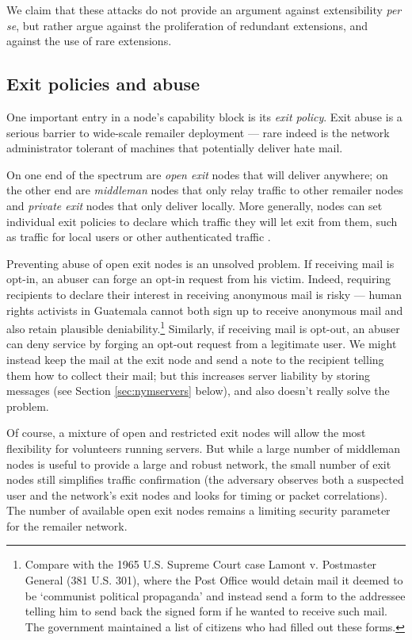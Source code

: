 \documentclass[11pt]{IEEEtran}
\begin{document}
We claim that these attacks do not provide an argument against
extensibility \emph{per se}, but rather argue against the proliferation
of redundant extensions, and against the use of rare extensions.  

\subsection{Exit policies and abuse}
\label{subsec:exitpolicies}

One important entry in a node's capability block is its \emph{exit
policy}. Exit abuse is a serious barrier to wide-scale remailer deployment
--- rare indeed is the network administrator tolerant of machines that
potentially deliver hate mail. %

On one end of the spectrum are \emph{open exit} nodes that will
deliver anywhere; on the other end are \emph{middleman} nodes that
only relay traffic to other remailer nodes and \emph{private exit}
nodes that only deliver locally. More generally, nodes can set
individual exit policies to declare which traffic they will let exit
from them, such as traffic for local users or other authenticated
traffic \cite{onion-discex00}.

Preventing abuse of open exit nodes is an unsolved problem. If
receiving mail is opt-in, an abuser can forge an opt-in request from
his victim. Indeed, requiring recipients to declare their interest
in receiving anonymous mail is risky --- human rights activists in
Guatemala cannot both sign up to receive anonymous mail and also retain
plausible deniability.\footnote{
  Compare with the 1965 U.S. Supreme Court case Lamont v. Postmaster
  General (381 U.S. 301), where the Post Office would detain mail it
  deemed to be `communist political propaganda' and instead send a form
  to the addressee telling him to send back the signed form if he wanted
  to receive such mail. The government maintained a list of citizens
  who had filled out these forms.
} Similarly, if receiving mail is opt-out, an abuser can deny service
by forging an opt-out request from a legitimate user. We might instead
keep the mail at the exit node and send a note to the recipient
telling them how to collect their mail; but this increases
server liability by storing messages (see Section \ref{sec:nymservers}
below), and also doesn't really solve the problem.

Of course, a mixture of open and restricted exit nodes will allow the
most flexibility for volunteers running servers. But while a large number
of middleman nodes is useful to provide a large and robust network, the
small number of exit nodes still simplifies traffic confirmation
(the adversary observes both a suspected user and the
network's exit nodes and looks for timing or packet correlations). The
number of available open exit nodes remains a limiting security parameter
for the remailer network.
\end{document}
